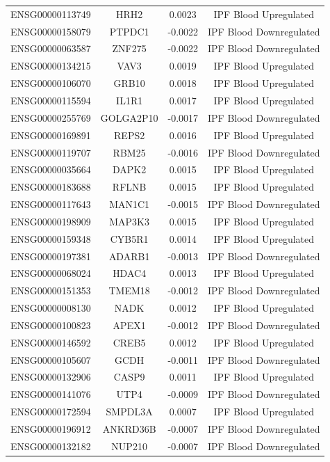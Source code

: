 \documentclass[
]{article}
\begin{document}
\begin{singlespace}
\begin{longtable}[t]{lccc}
ENSG00000113749 & HRH2 & 0.0023 & IPF Blood Upregulated\\
ENSG00000158079 & PTPDC1 & -0.0022 & IPF Blood Downregulated\\
ENSG00000063587 & ZNF275 & -0.0022 & IPF Blood Downregulated\\
\addlinespace
ENSG00000134215 & VAV3 & 0.0019 & IPF Blood Upregulated\\
ENSG00000106070 & GRB10 & 0.0018 & IPF Blood Upregulated\\
ENSG00000115594 & IL1R1 & 0.0017 & IPF Blood Upregulated\\
ENSG00000255769 & GOLGA2P10 & -0.0017 & IPF Blood Downregulated\\
ENSG00000169891 & REPS2 & 0.0016 & IPF Blood Upregulated\\
\addlinespace
ENSG00000119707 & RBM25 & -0.0016 & IPF Blood Downregulated\\
ENSG00000035664 & DAPK2 & 0.0015 & IPF Blood Upregulated\\
ENSG00000183688 & RFLNB & 0.0015 & IPF Blood Upregulated\\
ENSG00000117643 & MAN1C1 & -0.0015 & IPF Blood Downregulated\\
ENSG00000198909 & MAP3K3 & 0.0015 & IPF Blood Upregulated\\
\addlinespace
ENSG00000159348 & CYB5R1 & 0.0014 & IPF Blood Upregulated\\
ENSG00000197381 & ADARB1 & -0.0013 & IPF Blood Downregulated\\
ENSG00000068024 & HDAC4 & 0.0013 & IPF Blood Upregulated\\
ENSG00000151353 & TMEM18 & -0.0012 & IPF Blood Downregulated\\
ENSG00000008130 & NADK & 0.0012 & IPF Blood Upregulated\\
\addlinespace
ENSG00000100823 & APEX1 & -0.0012 & IPF Blood Downregulated\\
ENSG00000146592 & CREB5 & 0.0012 & IPF Blood Upregulated\\
ENSG00000105607 & GCDH & -0.0011 & IPF Blood Downregulated\\
ENSG00000132906 & CASP9 & 0.0011 & IPF Blood Upregulated\\
ENSG00000141076 & UTP4 & -0.0009 & IPF Blood Downregulated\\
\addlinespace
ENSG00000172594 & SMPDL3A & 0.0007 & IPF Blood Upregulated\\
ENSG00000196912 & ANKRD36B & -0.0007 & IPF Blood Downregulated\\
ENSG00000132182 & NUP210 & -0.0007 & IPF Blood Downregulated\\

\end{longtable}
\end{singlespace}
\end{document}
